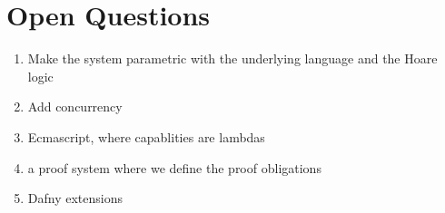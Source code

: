 \section{Open Questions}

\begin{enumerate}
\item
Make the system parametric with the underlying language and the Hoare logic
\item
Add concurrency
\item
Ecmascript, where capablities are lambdas
\item
a proof system where we define the proof obligations
\item
Dafny extensions
\end{enumerate}